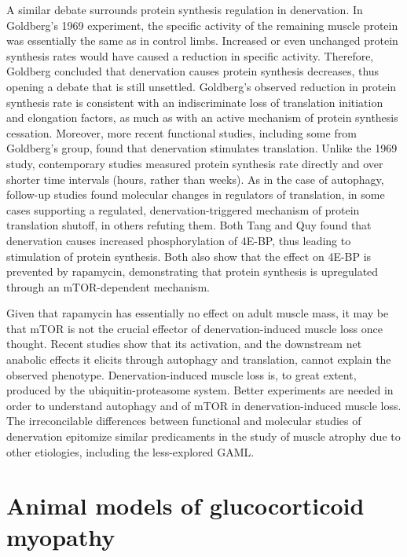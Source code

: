 \documentclass[12pt,english]{report}\usepackage[]{graphicx}\usepackage[]{color}
\begin{document}
A similar debate surrounds protein synthesis regulation in denervation.
In Goldberg's 1969 experiment, the specific activity of the remaining
muscle protein was essentially the same as in control limbs. Increased
or even unchanged protein synthesis rates would have caused a reduction
in specific activity. Therefore, Goldberg concluded that denervation
causes protein synthesis decreases, thus opening a debate that is
still unsettled. Goldberg's observed reduction in protein synthesis
rate is consistent with an indiscriminate loss of translation initiation
and elongation factors, as much as with an active mechanism of protein
synthesis cessation. Moreover, more recent functional studies, including
some from Goldberg's group, found that denervation stimulates translation\citep{goncalves2012clenbuterol,quy2013proteasome-dependent,gomes2012upregulation,joshi2014differential,furuno1990role}.
Unlike the 1969 study, contemporary studies measured protein synthesis
rate directly and over shorter time intervals (hours, rather than
weeks). As in the case of autophagy, follow-up studies found molecular
changes in regulators of translation, in some cases supporting a regulated,
denervation-triggered mechanism of protein translation shutoff, in
others refuting them. Both Tang and Quy found that denervation causes
increased phosphorylation of 4E-BP, thus leading to stimulation of
protein synthesis. Both also show that the effect on 4E-BP is prevented
by rapamycin, demonstrating that protein synthesis is upregulated
through an mTOR-dependent mechanism.

Given that rapamycin has essentially no effect on adult muscle mass,
it may be that mTOR is not the crucial effector of denervation-induced
muscle loss once thought. Recent studies show that its activation,
and the downstream net anabolic effects it elicits through autophagy
and translation, cannot explain the observed phenotype. Denervation-induced
muscle loss is, to great extent, produced by the ubiquitin-proteasome
system. Better experiments are needed in order to understand autophagy
and of mTOR in denervation-induced muscle loss. The irreconcilable
differences between functional and molecular studies of denervation
epitomize similar predicaments in the study of muscle atrophy due
to other etiologies, including the less-explored GAML.


\section{Animal models of glucocorticoid myopathy}
\end{document}
